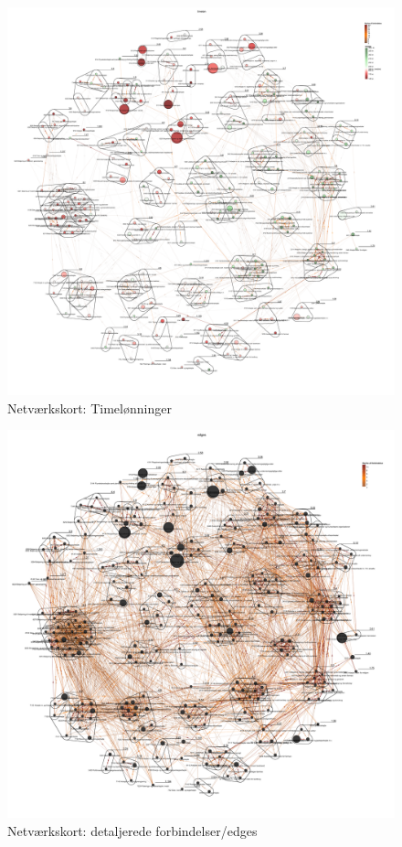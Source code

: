 \begin{figure}[H]
\begin{center}
	\caption{Netværkskort: Timelønninger}
	\label{appendiks kort timelon}
	\includegraphics[width=1.0\textwidth]{fig/netvaerkskort/kort_timelon.pdf}
\end{center}
\end{figure}
\restoregeometry



\begin{figure}[H]
\begin{center}
	\caption{Netværkskort: detaljerede forbindelser/edges}
	\label{appendiks kort edges}
	\includegraphics[width=1.0\textwidth]{fig/netvaerkskort/kort_edges.pdf}
\end{center}
\end{figure}
\restoregeometry

